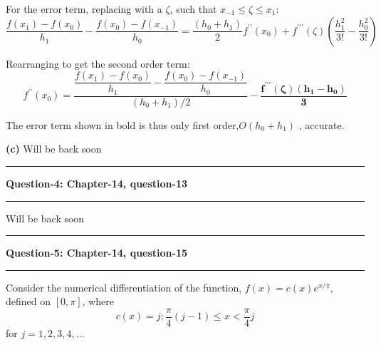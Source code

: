 \documentclass{article}
\newcommand\question[2]{\vspace{.25in}\hrule\textbf{#1: #2}\hrule\vspace{.10in}}
\renewcommand\part[1]{\vspace{.10in}\textbf{(#1)}}
\begin{document}
  For the error term, replacing with a $\zeta$, such that $x_{-1} \leq \zeta \leq x_1$:
  \[\dfrac{f(x_1) - f(x_0)}{h_1} - \dfrac{f(x_{0}) - f(x_{-1})}{h_0} = \dfrac{(h_0 + h_1)}{2}f^{\prime\prime}(x_0) + f^{\prime\prime\prime}(\zeta)(\dfrac{h_1^2}{3!} - \dfrac{h_0^2}{3!})\]

  Rearranging to get the second order term:
  \[f^{\prime\prime}(x_0) = \dfrac{\dfrac{f(x_1) - f(x_0)}{h_1} - \dfrac{f(x_{0}) - f(x_{-1})}{h_0}}{(h_0 + h_1)/2} - \mathbf{\dfrac{f^{\prime\prime\prime}(\zeta)(h_1 - h_0)}{3}}\]

  The error term shown in bold is thus only first order,$O(h_0 + h_1)$ , accurate.

  \part{c} Will be back soon

  \question{Question-4}{Chapter-14, question-13}
  Will be back soon

  \question{Question-5}{Chapter-14, question-15}
  Consider the numerical differentiation of the function, $f(x) = c(x)e^{x/\pi}$, defined on $[0,\pi]$, where
  \[c(x) = j; \dfrac{\pi}{4}(j-1) \leq x < \dfrac{\pi}{4}j\]
  for $j=1,2,3,4,\dots$
\end{document}
